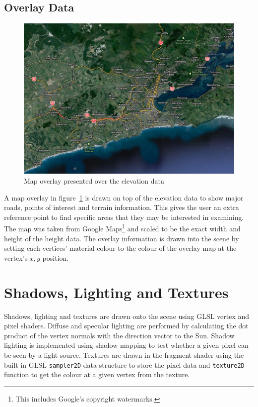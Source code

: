 \documentclass[12pt]{report}
\newcommand{\note}[1]{}
\newcommand{\notedme}[1]{}
\begin{document}
\subsection{Overlay Data}
\begin{figure}[h]
\centering
\includegraphics[scale=0.3]{suburbs.jpg}
\caption{Map overlay presented over the elevation data}
\label{image:overlay}
\end{figure}
A map overlay in figure~\ref{image:overlay} is drawn on top of the elevation data to show major roads, points of interest and terrain information. This gives the user an extra reference point to find specific areas that they may be interested in examining. The map was taken from Google Maps\footnote{This includes Google's copyright watermarks.} \cite{gmaps} and scaled to be the exact width and height of the height data. The overlay information is drawn into the scene by setting each vertices' material colour to the colour of the overlay map at the vertex's $x,y$ position.

\section{Shadows, Lighting and Textures}
Shadows, lighting and textures are drawn onto the scene using GLSL vertex and pixel shaders. Diffuse and specular lighting are performed by calculating the dot product of the vertex normals with the direction vector to the Sun. Shadow lighting is implemented using shadow mapping to test whether a given pixel can be seen by a light source. Textures are drawn in the fragment shader using the built in GLSL \texttt{sampler2D} data structure to store the pixel data and \texttt{texture2D} function to get the colour at a given vertex from the texture.\note{lowered density slightly}\notedme{?}\note{In your previous comment you said this section was a bit dense}
\end{document}
